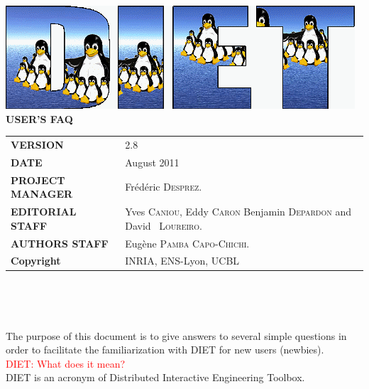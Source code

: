 \documentclass[12pt,a4paper]{book}
\newcommand{\dietversion}{2.8}
\begin{document}

\thispagestyle{empty}
\vspace*{3cm}
\vspace*{3cm}

\begin{center}
\includegraphics[scale=.5]{fig/logo_DIET_big}\\[2ex]
\textbf{\Huge USER'S FAQ\\[2ex]}
\end{center}

\vfill

\noindent
\small{
\begin{tabular}{ll}
  \textbf{VERSION}  & \dietversion\\
  \textbf{DATE}     & August 2011\\
  \textbf{PROJECT MANAGER}  & Fr\'ed\'eric \textsc{Desprez}.\\
  \textbf{EDITORIAL STAFF}  & Yves \textsc{Caniou}, Eddy
  \textsc{Caron} Benjamin \textsc{Depardon} and David ~\textsc{Loureiro}.\\
  \textbf{AUTHORS STAFF}    & 
\begin{minipage}[t]{12cm}
  Eug\`ene \textsc{Pamba Capo-Chichi}.
\end{minipage} \\
  \textbf{Copyright}& INRIA, ENS-Lyon, UCBL
\end{tabular}\\
}

\newpage
\thispagestyle{empty}
\ 



\newpage
\tableofcontents

\setlength{\columnseprule}{1pt}


\noindent The purpose of this document is to give answers to several simple questions in order to facilitate the familiarization with DIET for new users (newbies).\\

\noindent \textcolor{red}{DIET: What does it mean?}\\
DIET is an acronym of Distributed Interactive Engineering Toolbox.\\
\end{document}
